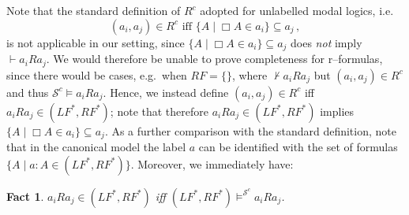 \documentclass[times, 10pt]{article}
\newtheorem{fact}{Fact}
\newcommand{\LF}{\mathit{LF}}
\newcommand{\RF}{\mathit{RF}}
\begin{document}
Note that the standard definition of $R^c$ adopted for unlabelled modal logics, i.e.
\begin{displaymath}
  (a_i,a_j) \in R^c  \text{ iff } \{A \mid \Box A \in a_i\} \subseteq a_j\,, 
\end{displaymath}
is not applicable in our setting, since $\{A \mid \Box A \in a_i\} \subseteq a_j$ does \emph{not} 
imply $\vdash a_i R a_j$.  We would therefore be unable to prove completeness for r--formulas, 
since there would be cases, e.g.~when $\RF = \{\}$, where $\nvdash a_i R a_j$ but 
$(a_i,a_j) \in R^c$ and thus $\mathscr{S}^c \vDash a_i R a_j$.  Hence, we instead define 
$(a_i,a_j) \in R^c$ iff $a_i R a_j \in (\LF^*,\RF^*)$; note that therefore $a_i R a_j \in (\LF^*,\RF^*)$
implies $\{A \mid \Box A \in a_i\} \subseteq a_j$.  As a further comparison with the standard 
definition, note that in the canonical model the label $a$ can be identified with the set of
formulas $\{A \mid a:A \in (\LF^*,\RF^*)\}$. Moreover, we immediately have:
\begin{fact}\label{fact-R}
  $a_i R a_j \in (\LF^*,\RF^*)$ iff $(\LF^*,\RF^*) \vDash^{\mathscr{S}^c} a_i R a_j$.
\end{fact}
\end{document}
